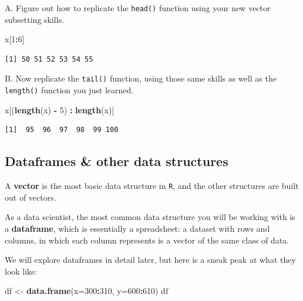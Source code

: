 \documentclass[
]{book}
\newenvironment{Shaded}{\begin{snugshade}}{\end{snugshade}}
\newcommand{\DataTypeTok}[1]{\textcolor[rgb]{0.13,0.29,0.53}{#1}}
\newcommand{\DecValTok}[1]{\textcolor[rgb]{0.00,0.00,0.81}{#1}}
\newcommand{\KeywordTok}[1]{\textcolor[rgb]{0.13,0.29,0.53}{\textbf{#1}}}
\newcommand{\NormalTok}[1]{#1}
\newcommand{\OperatorTok}[1]{\textcolor[rgb]{0.81,0.36,0.00}{\textbf{#1}}}
\newcommand{\StringTok}[1]{\textcolor[rgb]{0.31,0.60,0.02}{#1}}
\begin{document}
A. Figure out how to replicate the \texttt{head()} function using your new vector subsetting skills.

\begin{Shaded}
\begin{Highlighting}[]
\NormalTok{x[}\DecValTok{1}\OperatorTok{:}\DecValTok{6}\NormalTok{]}
\end{Highlighting}
\end{Shaded}

\begin{verbatim}
[1] 50 51 52 53 54 55
\end{verbatim}

B. Now replicate the \texttt{tail()} function, using those same skills as well as the \texttt{length()} function you just learned.

\begin{Shaded}
\begin{Highlighting}[]
\NormalTok{x[(}\KeywordTok{length}\NormalTok{(x) }\OperatorTok{-}\StringTok{ }\DecValTok{5}\NormalTok{) }\OperatorTok{:}\StringTok{ }\KeywordTok{length}\NormalTok{(x)]}
\end{Highlighting}
\end{Shaded}

\begin{verbatim}
[1]  95  96  97  98  99 100
\end{verbatim}

\hypertarget{dataframes-other-data-structures}{%
\subsection*{Dataframes \& other data structures}\label{dataframes-other-data-structures}}

A \textbf{vector} is the most basic data structure in \texttt{R}, and the other structures are built out of vectors.

As a data scientist, the most common data structure you will be working with is a \textbf{dataframe}, which is essentially a spreadsheet: a dataset with rows and columns, in which each column represents is a vector of the same class of data.

We will explore dataframes in detail later, but here is a sneak peak at what they look like:

\begin{Shaded}
\begin{Highlighting}[]
\NormalTok{df <-}\StringTok{ }\KeywordTok{data.frame}\NormalTok{(}\DataTypeTok{x=}\DecValTok{300}\OperatorTok{:}\DecValTok{310}\NormalTok{,}
           \DataTypeTok{y=}\DecValTok{600}\OperatorTok{:}\DecValTok{610}\NormalTok{)}
\NormalTok{df}
\end{Highlighting}
\end{Shaded}
\end{document}
